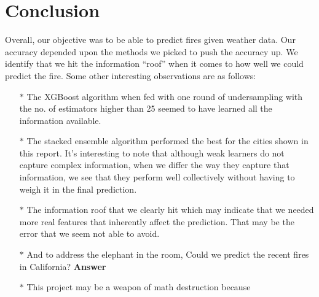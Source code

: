 \documentclass[10pt]{article}
\begin{document}
\section{Conclusion}
Overall, our objective was to be able to predict fires given weather data.
Our accuracy depended upon the methods we picked to push the accuracy up.
We identify that we hit the information ``roof'' when it comes to how well
we could predict the fire. Some other interesting observations are as
follows:\par
\begin{enumerate}
    \item[$\ast$]
    The XGBoost algorithm when fed with one round of undersampling with
    the no. of estimators higher than 25 seemed to have learned all the
    information available.
    \item[$\ast$]
    The stacked ensemble algorithm performed the best for the cities shown
    in this report. It's interesting to note that although weak learners
    do not capture complex information, when we differ the way they
    capture that information, we see that they perform well collectively
    without having to weigh it in the final prediction.
    \item[$\ast$]
    The information roof that we clearly hit which may indicate that we
    needed more real features that inherently affect the prediction. That
    may be the error that we seem not able to avoid.
    \item[$\ast$]
    And to address the elephant in the room, Could we predict the recent
    fires in California?
    \textbf{Answer}
    \item[$\ast$]
    This project may be a weapon of math destruction because 
\end{enumerate}
\nocite{*}


\end{document}

